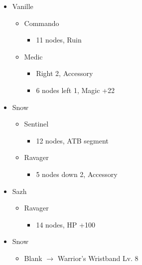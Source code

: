 \begin{menu}
	\begin{itemize}
		\crystarium
		\begin{itemize}
			\item Vanille
			      \begin{itemize}
				      \item Commando
				            \begin{itemize}
					            \item 11 nodes, Ruin
				            \end{itemize}
				      \item Medic
				            \begin{itemize}
					            \item Right 2, Accessory
					            \item 6 nodes left 1, Magic +22
				            \end{itemize}
			      \end{itemize}
			\item Snow
			      \begin{itemize}
				      \item Sentinel
				            \begin{itemize}
					            \item 12 nodes, ATB segment
				            \end{itemize}
				      \item Ravager
				            \begin{itemize}
					            \item 5 nodes down 2, Accessory
				            \end{itemize}
			      \end{itemize}
			\item Sazh
			      \begin{itemize}
				      \item Ravager
				            \begin{itemize}
					            \item 14 nodes,  HP +100
				            \end{itemize}
			      \end{itemize}
		\end{itemize}
		\equip
		\begin{itemize}
			\item Snow
			      \begin{itemize}
				      \item Blank $\rightarrow$ Warrior's Wristband Lv. 8

\end{itemize}
\end{itemize}
\end{itemize}
\end{menu}
